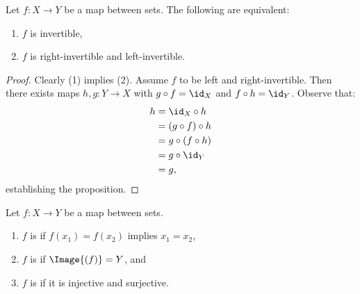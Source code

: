     \begin{proposition}
        Let $f:X \rightarrow Y$ be a map between sets. The following are equivalent:
            \begin{enumerate}[label = (\arabic*)]
                \item $f$ is invertible,
                \item $f$ is right-invertible and left-invertible.
            \end{enumerate}
    \end{proposition}
        \begin{proof}
            Clearly (1) implies (2). Assume $f$ to be left and right-invertible. Then there exists maps $h,g:Y \rightarrow X$ with  $g \circ f = \id_X$ and $f \circ h = \id_Y$. Observe that:
                \begin{equation*}
                \begin{split}
                    h &= \id_X \circ h\\
                     &= (g \circ f) \circ h \\
                      &= g \circ (f \circ h) \\
                       &= g \circ \id_Y \\
                       &= g,
                \end{split}
                \end{equation*}
            establishing the proposition.
        \end{proof}
    
    \begin{definition}
        Let $f:X \rightarrow Y$ be a map between sets.
            \begin{enumerate}[label = (\arabic*)]
                \item $f$ is  if $f(x_1) = f(x_2)$ implies $x_1 = x_2$,
                \item $f$ is  if $\Image{(f)} = Y$, and 
                \item $f$ is  if it is injective and surjective.
            \end{enumerate}
    \end{definition}

